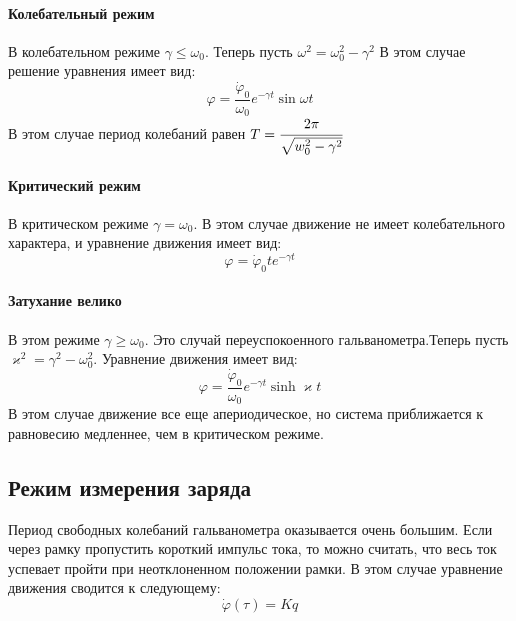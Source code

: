 \documentclass[a4paper,12pt]{article}
\begin{document}
		\paragraph{Колебательный режим}
		
		В колебательном режиме $\gamma \le \omega_0$. Теперь пусть $\omega^2 = \omega_0^2 - \gamma^2$ В этом случае решение уравнения имеет вид:
		\begin{equation}
			\varphi = \frac{\dot{\varphi}_0}{\omega_0}e^{-\gamma t}\sin\omega t
		\end{equation}
		В этом случае период колебаний равен $T = \cfrac{2\pi}{\sqrt{w_0^2-\gamma^2}}$
		
		\paragraph{Критический режим}
		
		В критическом режиме $\gamma =  \omega_0$. В этом случае движение не имеет колебательного характера, и уравнение движения имеет вид:
		\begin{equation}
			\varphi = \dot{\varphi}_0te^{-\gamma t}
		\end{equation}
		
		\paragraph{Затухание велико}
		
		В этом режиме $\gamma \ge \omega_0$. Это случай переуспокоенного гальванометра.Теперь пусть $\varkappa^2 = \gamma^2 - \omega_0^2$. Уравнение движения имеет вид:
		\begin{equation}
		\varphi = \frac{\dot{\varphi}_0}{\omega_0}e^{-\gamma t}\sinh\varkappa t
		\end{equation}
		В этом случае движение все еще апериодическое, но система приближается к равновесию медленнее, чем в критическом режиме.
		
		\subsection{Режим измерения заряда}
		Период свободных колебаний гальванометра оказывается очень большим. Если через рамку пропустить короткий импульс тока, то можно считать, что весь ток успевает пройти при неотклоненном положении рамки. В этом случае уравнение движения сводится к следующему:
		\begin{equation}
		\dot{\varphi}(\tau) = Kq
		\end{equation}
		
\end{document}
